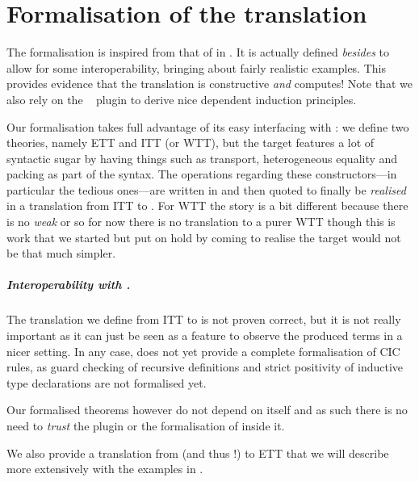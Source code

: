 \chapter{Formalisation of the translation}

The formalisation is inspired from that of \Coq in \MetaCoq. It is actually
defined \emph{besides} \MetaCoq to allow for some interoperability, bringing
about fairly realistic examples.
This provides evidence that the translation is constructive \emph{and} computes!
Note that we also rely on the
\Equations~ plugin to
derive nice dependent induction principles.

Our formalisation takes full advantage of its easy interfacing with \MetaCoq:
we define two theories, namely \acrshort{ETT} and \acrshort{ITT}
(or \acrshort{WTT}), but the target features a lot of syntactic
sugar by having things such as transport, heterogeneous equality and packing as
part of the syntax. The operations regarding these constructors---in particular
the tedious ones---are written in \Coq and then quoted to finally be
\emph{realised} in a translation from \acrshort{ITT} to \MetaCoq.
For \acrshort{WTT} the story is a bit different because there is no \emph{weak}
\Coq or \MetaCoq so for now there is no translation to a purer \acrshort{WTT}
though this is work that we started but put on hold by coming to realise the
target would not be that much simpler.

\paragraph{Interoperability with \MetaCoq.}
The translation we define from \acrshort{ITT} to \MetaCoq is not proven
correct, but it is not really important as it can just be seen as a
feature to observe the produced terms in a nicer setting.
In any case, \MetaCoq does not yet provide a complete formalisation of
\acrshort{CIC} rules, as guard checking of recursive definitions and strict
positivity of inductive type declarations are not formalised yet.

Our formalised theorems however do not depend on \MetaCoq itself and as such
there is no need to \emph{trust} the plugin or the formalisation of \Coq inside
it.

We also provide a translation from \MetaCoq (and thus \Coq!) to \acrshort{ETT}
that we will describe more extensively with the examples in
.

